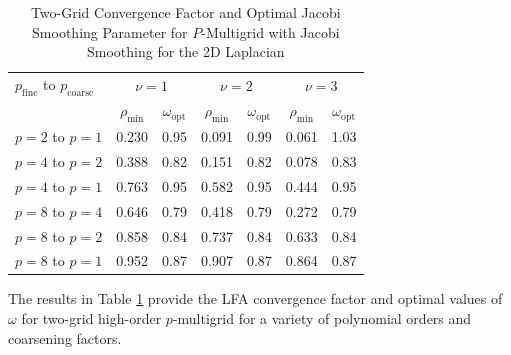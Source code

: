 \begin{table}[ht!]
\begin{center}
\begin{tabular}{l cc cc cc}
  \toprule
  $p_{\text{fine}}$ to $p_{\text{coarse}}$  &  \multicolumn{2}{c}{$\nu = 1$}  &  \multicolumn{2}{c}{$\nu = 2$}  &  \multicolumn{2}{c}{$\nu = 3$}  \\
                      &  $\rho_{\min}$  &  $\omega_{\text{opt}}$  &  $\rho_{\min}$ & $\omega_{\text{opt}}$  &  $\rho_{\min}$ & $\omega_{\text{opt}}$  \\
  \toprule
  $p = 2$ to $p = 1$  &  0.230 & 0.95  &  0.091 & 0.99  &  0.061 & 1.03   \\
  \midrule
  $p = 4$ to $p = 2$  &  0.388 & 0.82  &  0.151 & 0.82  &  0.078 & 0.83   \\
  $p = 4$ to $p = 1$  &  0.763 & 0.95  &  0.582 & 0.95  &  0.444 & 0.95   \\
  \midrule
  $p = 8$ to $p = 4$  &  0.646 & 0.79  &  0.418 & 0.79  &  0.272 & 0.79   \\
  $p = 8$ to $p = 2$  &  0.858 & 0.84  &  0.737 & 0.84  &  0.633 & 0.84   \\
  $p = 8$ to $p = 1$  &  0.952 & 0.87  &  0.907 & 0.87  &  0.864 & 0.87   \\
  \bottomrule
\end{tabular}
\end{center}
\caption{Two-Grid Convergence Factor and Optimal Jacobi Smoothing Parameter for $P$-Multigrid with Jacobi Smoothing for the 2D Laplacian}
\label{table:two_grid_2d}
\end{table}

The results in Table \ref{table:two_grid_2d} provide the LFA convergence factor and optimal values of $\omega$ for two-grid high-order $p$-multigrid for a variety of polynomial orders and coarsening factors.


